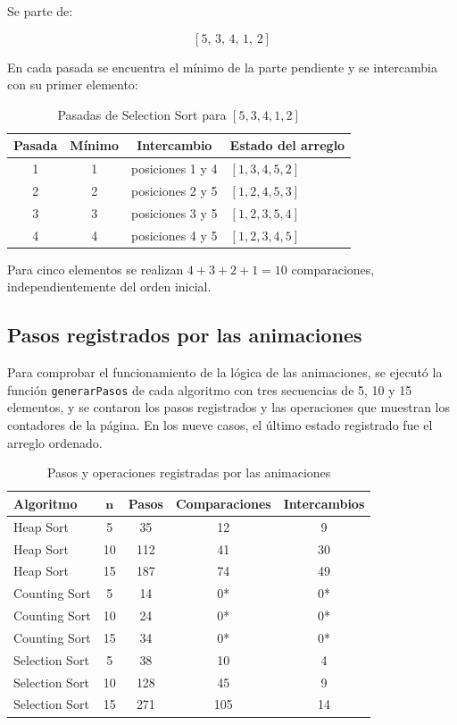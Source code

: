 \documentclass[12pt,a4paper]{article}
\begin{document}
Se parte de:

\[
[5,\,3,\,4,\,1,\,2]
\]

En cada pasada se encuentra el mínimo de la parte pendiente y se intercambia con su primer elemento:

\begin{table}[H]
\centering
\caption{Pasadas de Selection Sort para \([5,3,4,1,2]\)}
\begin{tabular}{cccl}
\toprule
\textbf{Pasada} & \textbf{Mínimo} & \textbf{Intercambio} & \textbf{Estado del arreglo} \\
\midrule
1 & 1 & posiciones 1 y 4 & \([1,3,4,5,2]\) \\
2 & 2 & posiciones 2 y 5 & \([1,2,4,5,3]\) \\
3 & 3 & posiciones 3 y 5 & \([1,2,3,5,4]\) \\
4 & 4 & posiciones 4 y 5 & \([1,2,3,4,5]\) \\
\bottomrule
\end{tabular}
\end{table}

Para cinco elementos se realizan \(4+3+2+1=10\) comparaciones, independientemente del orden inicial.

\subsection{Pasos registrados por las animaciones}

Para comprobar el funcionamiento de la lógica de las animaciones, se ejecutó la función \texttt{generarPasos} de cada algoritmo con tres secuencias de 5, 10 y 15 elementos, y se contaron los pasos registrados y las operaciones que muestran los contadores de la página. En los nueve casos, el último estado registrado fue el arreglo ordenado.

\begin{table}[H]
\centering
\caption{Pasos y operaciones registradas por las animaciones}
\begin{tabular}{lcccc}
\toprule
\textbf{Algoritmo} & \(\boldsymbol{n}\) & \textbf{Pasos} & \textbf{Comparaciones} & \textbf{Intercambios} \\
\midrule
Heap Sort & 5 & 35 & 12 & 9 \\
Heap Sort & 10 & 112 & 41 & 30 \\
Heap Sort & 15 & 187 & 74 & 49 \\
\midrule
Counting Sort & 5 & 14 & 0* & 0* \\
Counting Sort & 10 & 24 & 0* & 0* \\
Counting Sort & 15 & 34 & 0* & 0* \\
\midrule
Selection Sort & 5 & 38 & 10 & 4 \\
Selection Sort & 10 & 128 & 45 & 9 \\
Selection Sort & 15 & 271 & 105 & 14 \\
\bottomrule
\end{tabular}
\end{table}
\end{document}
